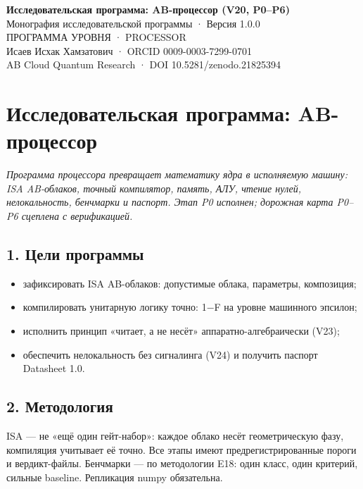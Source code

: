 \documentclass[11pt,a4paper]{article}
\begin{document}
\begin{center}
{\LARGE\bfseries Исследовательская программа: AB-процессор (V20, P0–P6)}\\[8pt]
{\large Монография исследовательской программы · Версия 1.0.0}\\[6pt]
{\color{copper}\small ПРОГРАММА УРОВНЯ · PROCESSOR}\\[4pt]
{\small Исаев Исхак Хамзатович · ORCID 0009-0003-7299-0701}\\[2pt]
{\small AB Cloud Quantum Research · DOI 10.5281/zenodo.21825394}
\end{center}

\tableofcontents
\newpage

\section{Исследовательская программа: AB-процессор}

\noindent\textit{\color{copper}Программа процессора превращает математику ядра в исполняемую машину: ISA AB-облаков, точный компилятор, память, АЛУ, чтение нулей, нелокальность, бенчмарки и паспорт. Этап P0 исполнен; дорожная карта P0–P6 сцеплена с верификацией.}

\subsection{1. Цели программы}

\begin{itemize}
  \item зафиксировать ISA AB-облаков: допустимые облака, параметры, композиция;
  \item компилировать унитарную логику точно: 1−F на уровне машинного эпсилон;
  \item исполнить принцип «читает, а не несёт» аппаратно-алгебраически (V23);
  \item обеспечить нелокальность без сигналинга (V24) и получить паспорт Datasheet 1.0.
\end{itemize}

\subsection{2. Методология}

ISA — не «ещё один гейт-набор»: каждое облако несёт геометрическую фазу, компиляция учитывает её точно. Все этапы имеют предрегистрированные пороги и вердикт-файлы. Бенчмарки — по методологии E18: один класс, один критерий, сильные baseline. Репликация numpy обязательна.
\end{document}
